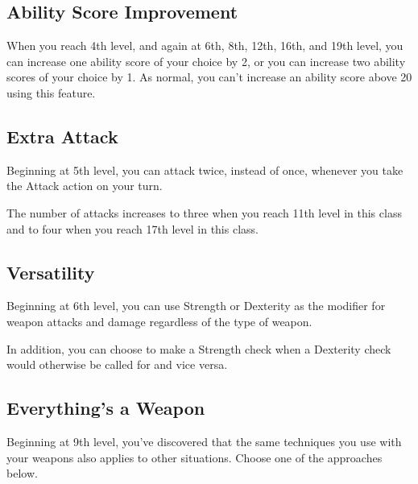 \subsection{Ability Score Improvement}

When you reach 4th level, and again at 6th, 8th, 12th, 16th, and 19th level, you can increase one ability score of your choice by 2, or you can increase two ability scores of your choice by 1. As normal, you can’t increase an ability score above 20 using this feature.

\subsection{Extra Attack}

Beginning at 5th level, you can attack twice, instead of once, whenever you take the Attack action on your turn.

The number of attacks increases to three when you reach 11th level in this class and to four when you reach 17th level in this class.

\subsection{Versatility}
Beginning at 6th level, you can use Strength or Dexterity as the modifier for weapon attacks and damage regardless of the type of weapon.

In addition, you can choose to make a Strength check when a Dexterity check would otherwise be called for and vice versa.

\subsection{Everything's a Weapon}
Beginning at 9th level, you've discovered that the same techniques you use with your weapons also applies to other situations. Choose one of the approaches below.

